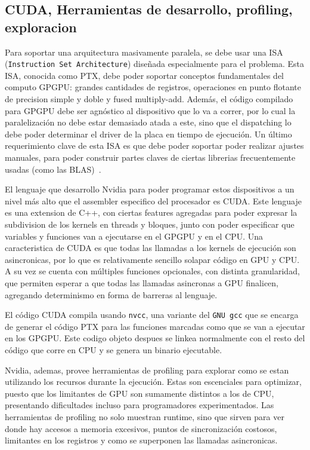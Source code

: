 \subsection{CUDA, Herramientas de desarrollo, profiling, exploracion}

Para soportar una arquitectura masivamente paralela, se debe usar una ISA
(\texttt{Instruction Set Architecture}) dise\~nada especialmente para el problema. Esta ISA, conocida como PTX,
debe poder soportar conceptos fundamentales del computo GPGPU: grandes cantidades de registros,
operaciones en punto flotante de precision simple y doble y fused multiply-add. Adem\'as,
el c\'odigo compilado para GPGPU debe ser agn\'ostico al dispositivo que lo va a correr, por
lo cual la paralelizaci\'on no debe estar demasiado atada a este, sino que el dispatching
lo debe poder determinar el driver de la placa en tiempo de ejecuci\'on.  Un \'ultimo
requerimiento clave de esta ISA es que debe poder soportar poder realizar ajustes manuales,
para poder construir partes claves de ciertas librerias frecuentemente usadas (como las BLAS)~\cite{NvidiaFermi}.

El lenguaje que desarrollo Nvidia para poder programar estos dispositivos a un nivel m\'as alto
que el assembler especifico del procesador es CUDA. Este lenguaje es una extension de C++, con ciertas
features agregadas para poder expresar la subdivision de los kernels en threads y bloques, junto
con poder especificar que variables y funciones van a ejecutarse en el GPGPU y en el CPU. Una caracteristica
de CUDA es que todas las llamadas a los kernels de ejecuci\'on son asincronicas, por lo que es relativamente
sencillo solapar c\'odigo en GPU y CPU. A su vez se cuenta con m\'ultiples funciones opcionales, con distinta
granularidad, que permiten esperar a que todas las llamadas asincronas a GPU finalicen, agregando determinismo
en forma de barreras al lenguaje.

El c\'odigo CUDA compila usando \texttt{nvcc}, una variante del \texttt{GNU gcc} que se
encarga de generar el c\'odigo PTX para las funciones marcadas como que se van a ejecutar
en los GPGPU. Este codigo objeto despues se linkea normalmente con el resto del c\'odigo que corre en CPU
y se genera un binario ejecutable.

Nvidia, ademas, provee herramientas de profiling para explorar como se estan utilizando los
recursos durante la ejecuci\'on. Estas son escenciales para optimizar, puesto que los limitantes
de GPU son sumamente distintos a los de CPU, presentando dificultades incluso para programadores
experimentados. Las herramientas de profiling no solo muestran runtime, sino que sirven para
ver donde hay accesos a memoria excesivos, puntos de sincronizaci\'on costosos, limitantes
en los registros y como se superponen las llamadas asincronicas.

